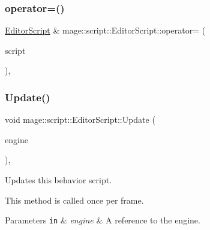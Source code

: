 \hypertarget{classmage_1_1script_1_1_editor_script_a87df2b20fee97f6aa9e09b4b5c9282a5}{}\label{classmage_1_1script_1_1_editor_script_a87df2b20fee97f6aa9e09b4b5c9282a5} 
\subsubsection{\texorpdfstring{operator=()}{operator=()}\hspace{0.1cm}{\footnotesize\ttfamily [2/2]}}
{\footnotesize\ttfamily \hyperlink{classmage_1_1script_1_1_editor_script}{Editor\+Script} \& mage\+::script\+::\+Editor\+Script\+::operator= (\begin{DoxyParamCaption}\item[{\hyperlink{classmage_1_1script_1_1_editor_script}{Editor\+Script} \&\&}]{script }\end{DoxyParamCaption})\hspace{0.3cm}{\ttfamily [default]}, {\ttfamily [noexcept]}}

\hypertarget{classmage_1_1script_1_1_editor_script_a311532d499edfaf3f74aa598fb87ec8e}{}\label{classmage_1_1script_1_1_editor_script_a311532d499edfaf3f74aa598fb87ec8e} 
\subsubsection{\texorpdfstring{Update()}{Update()}}
{\footnotesize\ttfamily void mage\+::script\+::\+Editor\+Script\+::\+Update (\begin{DoxyParamCaption}\item[{\mbox{[}\mbox{[}maybe\+\_\+unused\mbox{]} \mbox{]} \hyperlink{classmage_1_1_engine}{Engine} \&}]{engine }\end{DoxyParamCaption})\hspace{0.3cm}{\ttfamily [override]}, {\ttfamily [virtual]}}

Updates this behavior script.

This method is called once per frame.


\begin{DoxyParams}[1]{Parameters}
\mbox{\tt in}  & {\em engine} & A reference to the engine. \\
\hline
\end{DoxyParams}

